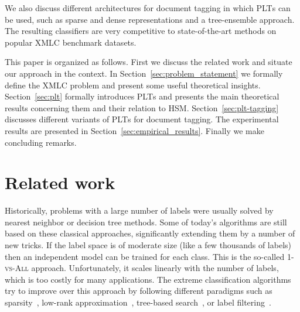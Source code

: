 \documentclass{article}
\newcommand{\Algo}[1]{\textsc{#1}}
\newcommand{\sectionBefore}{-0pt}
\newcommand{\sectionAfter}{-0pt}
\begin{document}
We also discuss different architectures for document tagging in which
\Algo{PLT}s can be used, such as sparse and dense representations and
a tree-ensemble approach. The resulting classifiers
are very competitive to state-of-the-art methods on popular XMLC
benchmark datasets.

This paper is organized as follows. First we discuss the related work
and situate our approach in the context. In
Section~\ref{sec:problem_statement} we formally define the XMLC
problem and present some useful theoretical
insights. Section~\ref{sec:plt} formally introduces \Algo{PLT}s and
presents the main theoretical results concerning them and their
relation to \Algo{HSM}. Section~\ref{sec:plt-tagging} discusses
different variants of \Algo{PLT}s for document tagging. 
The experimental results are presented in
Section~\ref{sec:empirical_results}. 
Finally we make concluding remarks. %



\vspace{\sectionBefore}
\section{Related work}
\label{sec:related_work}
\vspace{\sectionAfter}

Historically, problems with a large number of labels were usually
solved by nearest neighbor or decision tree methods. Some of today's
algorithms are still based on these classical approaches,
significantly extending them by a number of new tricks. If the label
space is of moderate size (like a few thousands of labels) then an
independent model can be trained for each class. This is the so-called
\Algo{1-vs-All} approach. Unfortunately, it scales linearly with the
number of labels, which is too costly for many applications. The
extreme classification algorithms try to improve over this approach
by following different paradigms such as
sparsity~\citep{Yen_et_al_2017,Babbar_Scholkopf_2017}, low-rank
approximation~\cite{Mineiro_Karampatziakis_2015,Yu_et_al_2014,Bhatia_et_al_2015},
tree-based
search~\citep{Prabhu_Varma_2014,Choromanska_Langford_2015}, or label
filtering~\citep{Vijayanarasimhan_et_al_2014,Shrivastava_Li_2015,Niculescu-Mizil_Abbasnejad_2017}.
\end{document}
